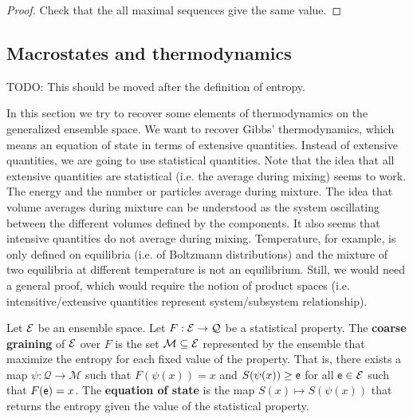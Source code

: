 
\begin{proof}
	Check that the all maximal sequences give the same value.
\end{proof}

\subsection{Macrostates and thermodynamics}

TODO: This should be moved after the definition of entropy.

In this section we try to recover some elements of thermodynamics on the generalized ensemble space. We want to recover Gibbs' thermodynamics, which means an equation of state in terms of extensive quantities. Instead of extensive quantities, we are going to use statistical quantities. Note that the idea that all extensive quantities are statistical (i.e. the average during mixing) seems to work. The energy and the number or particles average during mixture. The idea that volume averages during mixture can be understood as the system oscillating between the different volumes defined by the components. It also seems that intensive quantities do not average during mixing. Temperature, for example, is only defined on equilibria (i.e. of Boltzmann distributions) and the mixture of two equilibria at different temperature is not an equilibrium. Still, we would need a general proof, which would require the notion of product spaces (i.e. intensitive/extensive quantities represent system/subsystem relationship).

\begin{defn}
	Let $\mathcal{E}$ be an ensemble space. Let $F : \mathcal{E} \to \mathcal{Q}$ be a statistical property. The \textbf{coarse graining} of $\mathcal{E}$ over $F$ is the set $\mathcal{M} \subseteq \mathcal{E}$ represented by the ensemble that maximize the entropy for each fixed value of the property. That is, there exists a map $\psi : \mathcal{Q} \to \mathcal{M}$ such that $F(\psi(x)) = x$ and $S(\psi(x)) \geq \mathsf{e}$ for all $\mathsf{e} \in \mathcal{E}$ such that $F(\mathsf{e}) = x$. The \textbf{equation of state} is the map $S(x) \mapsto S(\psi(x))$ that returns the entropy given the value of the statistical property.
\end{defn}

